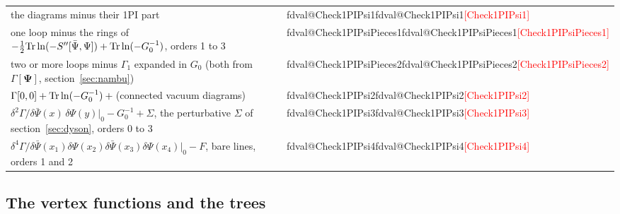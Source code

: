 \documentclass[11pt,a4paper]{article}
\makeatletter
\newcommand{\sfieldmean}{\boldsymbol\Psi}
\newcommand{\val}[1]{\ifcsname fdval@#1\endcsname\csname fdval@#1\endcsname\else\textcolor{red}{[#1]}\fi}
\makeatother
\begin{document}
\begin{result}
\begin{tabular}{@{}l@{\quad}l@{}}
the diagrams minus their 1PI part & \val{Check1PIPsi1}\\
one loop minus the rings of $-\frac12{\rm Tr}\ln(-S''[\bar\Psi,\Psi])+{\rm Tr}\ln(-G_0^{-1})$, orders 1 to 3 & \val{Check1PIPsiPieces1}\\
two or more loops minus $\Gamma_1$ expanded in $G_0$ (both from $\Gamma[\sfieldmean]$, section~\ref{sec:nambu}) & \val{Check1PIPsiPieces2}\\
$\Gamma[0,0]+{\rm Tr}\ln(-G_0^{-1})+{}$(connected vacuum diagrams) & \val{Check1PIPsi2}\\
$\delta^2\Gamma/\delta\bar\Psi(x)\,\delta\Psi(y)|_0-G_0^{-1}+\Sigma$, the perturbative $\Sigma$ of section~\ref{sec:dyson}, orders 0 to 3 & \val{Check1PIPsi3}\\
$\delta^4\Gamma/\delta\bar\Psi(x_1)\delta\Psi(x_2)\delta\bar\Psi(x_3)\delta\Psi(x_4)|_0-F$, bare lines, orders 1 and 2 & \val{Check1PIPsi4}
\end{tabular}
\end{result}

\subsection{The vertex functions and the trees}\label{sec:trees}
\end{document}
